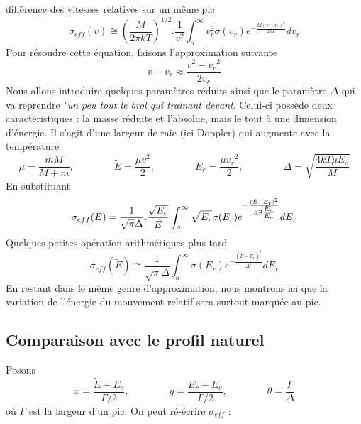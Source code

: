 	différence des vitesses relatives sur un même pic
	\begin{equation}
	{\sigma _{eff}}(v) \cong {\left( {\frac{M}{{2\pi kT}}} \right)^{1/2}}.\frac{1}{{{v^2}}}\int_o^
	\infty    v_r^2\sigma ({v_r}){e^{ - \frac{{M{{(v - {v_r})}^2}}}{{2kT}}}}d{v_r}
	\end{equation}
	Pour résoudre cette équation, faisons l'approximation suivante
	\begin{equation}
	v - {v_r} \approx \frac{{{v^2} - {v_r}^2}}{{2{v_r}}}
	\end{equation}
	Nous allons introduire quelques paramètres réduits ainsi que le paramètre $\Delta$ qui va 
	reprendre "\textit{un peu tout le brol qui trainant devant}. Celui-ci possède deux 
	caractéristiques : la masse réduite et l'absolue, mais le tout à une dimension d'énergie. Il 
	s'agit d'une largeur de raie (ici Doppler) qui augmente avec la température
	\begin{equation}
	\mu  = \frac{{mM}}{{M + m}},\qquad\qquad \tilde E = \frac{{\mu {v^2}}}{2},\qquad\qquad
	{E_r} = \frac{{\mu {v_r}^2}}{2},\qquad\qquad \Delta  = \sqrt {\frac{{4kT\mu {E_o}}}{M}} 
	\end{equation}
	En substituant
	\begin{equation}
	{\sigma _{eff}}(\tilde E) = \frac{1}{{\sqrt \pi  \Delta }}.\frac{{\sqrt {{E_o}} }}{{\tilde E}}
	\int_o^\infty    \sqrt {{E_r}} \sigma ({E_r}){e^{ - \frac{{{{(\tilde E - {E_r})}^2}}}{{{\Delta
	 ^2}{\textstyle{{{E_r}} \over {{E_o}}}}}}}}d{E_r}
	\end{equation}
	Quelques petites opération arithmétiques plus tard
	\begin{equation}
	{\sigma _{eff}}(\tilde E) \cong \frac{1}{{\sqrt \pi  \Delta }}\int_o^\infty    \sigma ({E_r}){e^{
	 - \frac{{{{(\tilde E - {E_r})}^2}}}{{{\Delta ^2}}}}}d{E_r}
	\end{equation}
	En restant dans le même genre d'approximation, nous montrons ici que la variation de l'énergie
	du mouvement relatif sera surtout marquée au pic.
	
	

	\subsection{Comparaison avec le profil naturel}
	Posons
	\begin{equation}
	x = \frac{{\tilde E - {E_o}}}{{\Gamma /2}},\qquad\qquad 
	y = \frac{{{E_r} - {E_o}}}{{\Gamma /2}},\qquad\qquad \theta  = \frac{\Gamma }{\Delta }
	\end{equation}		
	où $\Gamma$ est la largeur d'un pic. On peut ré-écrire $\sigma_{eff}$ :\\
	
